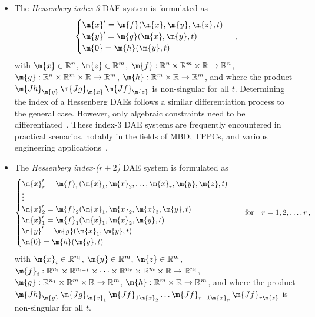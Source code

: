 \begin{itemize}
  \item The \emph{Hessenberg index-3} \ac{DAE} system is formulated as
  \begin{equation*}
    \begin{cases}
      \m{x}^\prime = \m{f}(\m{x}, \m{y}, \m{z}, t) \\
      \m{y}^\prime = \m{g}(\m{x}, \m{y}, t) \\
      \m{0}        = \m{h}(\m{y}, t)
    \end{cases} \, \text{,}
  \end{equation*}
  with $\m{x} \in \mathbb{R}^n$, $\m{z} \in \mathbb{R}^m$, $\m{f}: \mathbb{R}^{n} \times \mathbb{R}^{m} \times \mathbb{R} \rightarrow \mathbb{R}^{n}$, $\m{g}: \mathbb{R}^{n} \times \mathbb{R}^{m} \times \mathbb{R} \rightarrow \mathbb{R}^{m}$, $\m{h}: \mathbb{R}^{m} \times \mathbb{R} \rightarrow \mathbb{R}^{m}$, and where the product $\m{Jh}_{\m{y}} \, \m{Jg}_{\m{x}} \, \m{Jf}_{\m{z}}$ is non-singular for all $t$. Determining the index of a Hessenberg \acp{DAE} follows a similar differentiation process to the general case. However, only algebraic constraints need to be differentiated~\cite{ascher1991projected}. These index-3 \ac{DAE} systems are frequently encountered in practical scenarios, notably in the fields of \ac{MBD}, \acp{TPPC}, and various engineering applications~\cite{ascher1998computer,brenan1995numerical}.
  \item The \emph{Hessenberg index-($r+2$)} \ac{DAE} system is formulated as
  \begin{equation*}
    \begin{cases}
      \m{x}_r^\prime = \m{f}_r(\m{x}_1, \m{x}_2, \dots, \m{x}_r, \m{y}, \m{z}, t) \\
      \vdots \\
      \m{x}_2^\prime = \m{f}_2(\m{x}_1, \m{x}_2, \m{x}_3, \m{y}, t) \\
      \m{x}_1^\prime = \m{f}_1(\m{x}_1, \m{x}_2, \m{y}, t) \\
      \m{y}^\prime = \m{g}(\m{x}_1, \m{y}, t) \\
      \m{0}        = \m{h}(\m{y}, t)
    \end{cases} \quad \text{for} \quad r = 1, 2, \dots, r \, \text{,}
  \end{equation*}
  with $\m{x}_i \in \mathbb{R}^{n_i}$, $\m{y} \in \mathbb{R}^m$, $\m{z} \in \mathbb{R}^m$, $\m{f}_i: \mathbb{R}^{n_i} \times \mathbb{R}^{n_{i+1}} \times \dots \times \mathbb{R}^{n_r} \times \mathbb{R}^{m} \times \mathbb{R} \rightarrow \mathbb{R}^{n_i}$, $\m{g}: \mathbb{R}^{n_1} \times \mathbb{R}^{m} \times \mathbb{R} \rightarrow \mathbb{R}^{m}$, $\m{h}: \mathbb{R}^{m} \times \mathbb{R} \rightarrow \mathbb{R}^{m}$, and where the product $\m{Jh}_{\m{y}} \, \m{Jg}_{\m{x}_1} \, \m{Jf}_{1\m{x}_2} \dots \m{Jf}_{r-1\m{x}_r} \, \m{Jf}_{r\m{z}}$ is non-singular for all $t$.
\end{itemize}

